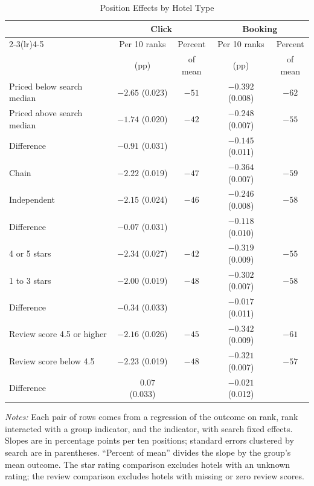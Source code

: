 \documentclass[12pt]{article}
\begin{document}
\begin{table}[htbp]
\centering
\begin{threeparttable}
\caption{Position Effects by Hotel Type}
\label{tab:hetero}
\begin{tabular}{lcccc}
\toprule
 & \multicolumn{2}{c}{Click} & \multicolumn{2}{c}{Booking} \\
\cmidrule(lr){2-3}\cmidrule(lr){4-5}
 & Per 10 ranks & Percent & Per 10 ranks & Percent \\
 & (pp) & of mean & (pp) & of mean \\
\midrule
Priced below search median & $-2.65$ (0.023) & $-51$ & $-0.392$ (0.008) & $-62$ \\
Priced above search median & $-1.74$ (0.020) & $-42$ & $-0.248$ (0.007) & $-55$ \\
\quad Difference & $-0.91$ (0.031) & & $-0.145$ (0.011) & \\[0.4em]
Chain & $-2.22$ (0.019) & $-47$ & $-0.364$ (0.007) & $-59$ \\
Independent & $-2.15$ (0.024) & $-46$ & $-0.246$ (0.008) & $-58$ \\
\quad Difference & $-0.07$ (0.031) & & $-0.118$ (0.010) & \\[0.4em]
4 or 5 stars & $-2.34$ (0.027) & $-42$ & $-0.319$ (0.009) & $-55$ \\
1 to 3 stars & $-2.00$ (0.019) & $-48$ & $-0.302$ (0.007) & $-58$ \\
\quad Difference & $-0.34$ (0.033) & & $-0.017$ (0.011) & \\[0.4em]
Review score 4.5 or higher & $-2.16$ (0.026) & $-45$ & $-0.342$ (0.009) & $-61$ \\
Review score below 4.5 & $-2.23$ (0.019) & $-48$ & $-0.321$ (0.007) & $-57$ \\
\quad Difference & $\phantom{-}0.07$ (0.033) & & $-0.021$ (0.012) & \\
\bottomrule
\end{tabular}
\begin{tablenotes}\footnotesize
\item \textit{Notes:} Each pair of rows comes from a regression of the outcome on rank, rank interacted with a group indicator, and the indicator, with search fixed effects. Slopes are in percentage points per ten positions; standard errors clustered by search are in parentheses. ``Percent of mean'' divides the slope by the group's mean outcome. The star rating comparison excludes hotels with an unknown rating; the review comparison excludes hotels with missing or zero review scores.
\end{tablenotes}
\end{threeparttable}
\end{table}
\end{document}
